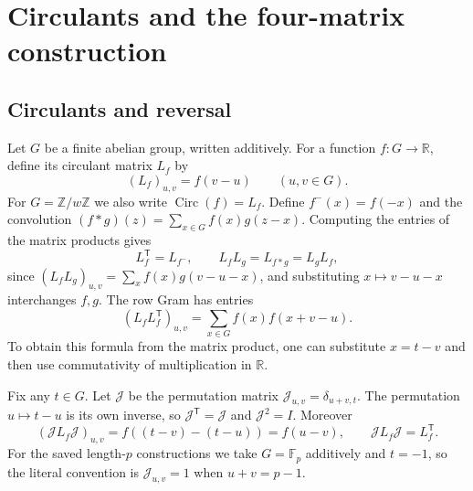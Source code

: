 \documentclass[10pt]{article}
\newcommand{\F}{\mathbb F}
\newcommand{\Circ}{\operatorname{Circ}}
\begin{document}
\section{Circulants and the four-matrix construction}\label{sec:design}

\subsection{Circulants and reversal}
Let $G$ be a finite abelian group, written additively. For a function
$f\colon G\to\mathbb R$, define its circulant matrix $L_f$ by
\[
 (L_f)_{u,v}=f(v-u)\qquad(u,v\in G).
\]
For $G=\mathbb Z/w\mathbb Z$ we also write $\Circ(f)=L_f$.
Define $f^-(x)=f(-x)$ and the convolution
$(f*g)(z)=\sum_{x\in G}f(x)g(z-x)$.
Computing the entries of the matrix products gives
\[
 L_f^{\mathsf T}=L_{f^-},\qquad
 L_fL_g=L_{f*g}=L_gL_f,
\]
since $(L_fL_g)_{u,v}=\sum_x f(x)g(v-u-x)$, and substituting
$x\mapsto v-u-x$ interchanges $f,g$.
The row Gram has entries
\begin{equation}\label{eq:circulant-gram}
 (L_fL_f^{\mathsf T})_{u,v}
 =\sum_{x\in G}f(x)f(x+v-u).
\end{equation}
To obtain this formula from the matrix product, one can substitute
$x=t-v$ and then use commutativity of multiplication in $\mathbb R$.

Fix any $t\in G$. Let $\mathcal J$ be the permutation matrix
$\mathcal J_{u,v}=\delta_{u+v,t}$. The permutation $u\mapsto t-u$ is its own inverse,
so $\mathcal J^{\mathsf T}=\mathcal J$ and $\mathcal J^2=I$. Moreover
\[
 (\mathcal JL_f\mathcal J)_{u,v}=f((t-v)-(t-u))=f(u-v),
 \qquad \mathcal JL_f\mathcal J=L_f^{\mathsf T}.
\]
For the saved length-$p$ constructions we take $G=\F_p$ additively and
$t=-1$, so the literal convention is $\mathcal J_{u,v}=1$ when $u+v=p-1$.
\end{document}
